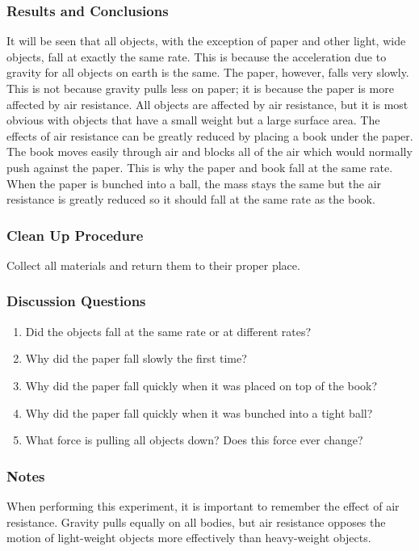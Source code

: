 \subsubsection*{Results and Conclusions}
It will be seen that all objects, with the exception of paper and other light, wide objects, fall at exactly the same rate. This is because the acceleration due to gravity for all objects on earth is the same.  
The paper, however, falls very slowly. This is not because gravity pulls less on paper; it is because the paper is more affected by air resistance. All objects are affected by air resistance, but it is most obvious with objects that have a small weight but a large surface area. The effects of air resistance can be greatly reduced by placing a book under the paper. The book moves easily through air and blocks all of the air which would normally push against the paper. This is why the paper and book fall at the same rate.  When the paper is bunched into a ball, the mass stays the same but the air resistance is greatly reduced so it should fall at the same rate as the book.

\subsubsection*{Clean Up Procedure}
Collect all materials and return them to their proper place.

\subsubsection*{Discussion Questions}
\begin{enumerate}
\item{Did the objects fall at the same rate or at different rates?}
\item{Why did the paper fall slowly the first time?}
\item{Why did the paper fall quickly when it was placed on top of the book?}
\item{Why did the paper fall quickly when it was bunched into a tight ball?}
\item{What force is pulling all objects down? Does this force ever change?}
\end{enumerate}

\subsubsection*{Notes}
When performing this experiment, it is important to remember the effect of air resistance.  Gravity pulls equally on all bodies, but air resistance opposes the motion of light-weight objects more effectively than heavy-weight objects.

